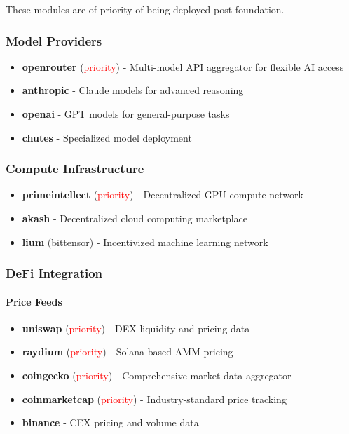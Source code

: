 \documentclass{article}
\begin{document}
These modules are of priority of being deployed post foundation.

\subsubsection{Model Providers}
\begin{itemize}[leftmargin=*]
    \item \textbf{openrouter} (\textcolor{red}{priority}) - Multi-model API aggregator for flexible AI access
    \item \textbf{anthropic} - Claude models for advanced reasoning
    \item \textbf{openai} - GPT models for general-purpose tasks
    \item \textbf{chutes} - Specialized model deployment
\end{itemize}

\subsubsection{Compute Infrastructure}
\begin{itemize}[leftmargin=*]
    \item \textbf{primeintellect} (\textcolor{red}{priority}) - Decentralized GPU compute network
    \item \textbf{akash} - Decentralized cloud computing marketplace
    \item \textbf{lium} (bittensor) - Incentivized machine learning network
\end{itemize}

\subsubsection{DeFi Integration}

\paragraph{Price Feeds}
\begin{itemize}[leftmargin=*]
    \item \textbf{uniswap} (\textcolor{red}{priority}) - DEX liquidity and pricing data
    \item \textbf{raydium} (\textcolor{red}{priority}) - Solana-based AMM pricing
    \item \textbf{coingecko} (\textcolor{red}{priority}) - Comprehensive market data aggregator
    \item \textbf{coinmarketcap} (\textcolor{red}{priority}) - Industry-standard price tracking
    \item \textbf{binance} - CEX pricing and volume data
\end{itemize}
\end{document}
